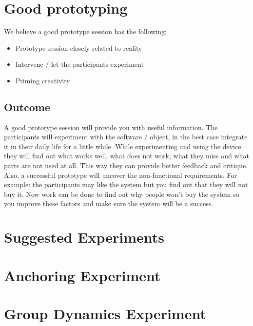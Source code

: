 \documentclass{article}
\begin{document}
\section{Good prototyping}
We believe a good prototype session has the following:

\begin{itemize}
\item Prototype session closely related to reality
\item Intervene / let the participants experiment
\item Priming creativity 
\end{itemize}
 
\subsection{Outcome}
A good prototype session will provide you with useful information. The participants
will experiment with the software / object, in the best case integrate it in their
daily life for a little while. While experimenting and using the device they will
find out what works well, what does not work, what they miss and what parts
are not used at all. This way they can provide better feedback and critique.
Also, a successful prototype will uncover the non-functional requirements.
For example: the participants may like the system but you find out that they will not
buy it. Now work can be done to find out why people won't buy the system so you improve these factors and  make sure the system will be a success.


\section{Suggested Experiments}



\section{Anchoring Experiment}



\section{Group Dynamics Experiment}



\end{document}
